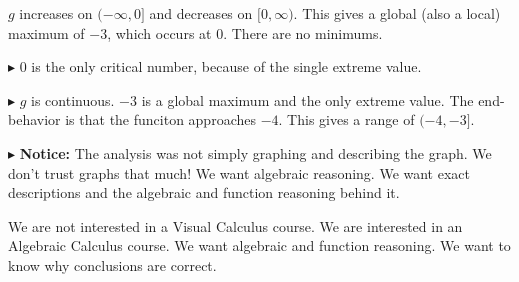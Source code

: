 \documentclass{ximera}
\begin{document}
\begin{image}
\end{image}


$g$ increases on $(-\infty, 0]$ and decreases on $[0, \infty)$.  This gives a global (also a local) maximum of $-3$, which occurs at $0$.   There are no minimums.


$\blacktriangleright$  $0$ is the only critical number, because of the single extreme value.


$\blacktriangleright$  $g$ is continuous.  $-3$ is a global maximum and the only extreme value. The end-behavior is that the funciton approaches $-4$. This gives a range of $(-4, -3]$.









$\blacktriangleright$ \textbf{\textcolor{red!80!black}{Notice:}}  The analysis was not simply graphing and describing the graph.  We don't trust graphs that much!  We want algebraic reasoning.  We want exact descriptions and the algebraic and function reasoning behind it.

We are not interested in a Visual Calculus course.  We are interested in an Algebraic Calculus course.  We want algebraic and function reasoning.  We want to know why conclusions are correct.
\end{document}
